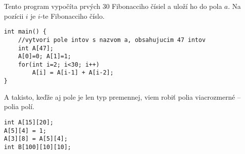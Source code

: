 Tento program vypočíta prvých $30$ Fibonacciho čísiel a uloží ho do pola $a$. Na pozícii $i$ je
$i$-te Fibonacciho číslo.

\begin{lstlisting}
int main() {
    //vytvori pole intov s nazvom a, obsahujucim 47 intov
    int A[47];
    A[0]=0; A[1]=1;
    for(int i=2; i<30; i++)
        A[i] = A[i-1] + A[i-2];
}
\end{lstlisting}

A takisto, keďže aj pole je len typ premennej, viem robiť polia viacrozmerné -- polia polí.

\begin{lstlisting}
int A[15][20];
A[5][4] = 1;
A[3][8] = A[5][4];
int B[100][10][10];
\end{lstlisting}


